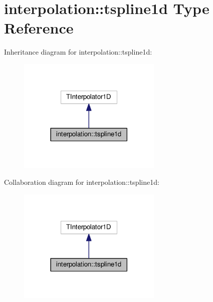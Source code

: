 \hypertarget{structinterpolation_1_1tspline1d}{}\section{interpolation\+:\+:tspline1d Type Reference}
\label{structinterpolation_1_1tspline1d}


Inheritance diagram for interpolation\+:\+:tspline1d\+:
\nopagebreak
\begin{figure}[H]
\begin{center}
\leavevmode
\includegraphics[width=194pt]{structinterpolation_1_1tspline1d__inherit__graph}
\end{center}
\end{figure}


Collaboration diagram for interpolation\+:\+:tspline1d\+:
\nopagebreak
\begin{figure}[H]
\begin{center}
\leavevmode
\includegraphics[width=194pt]{structinterpolation_1_1tspline1d__coll__graph}
\end{center}
\end{figure}
